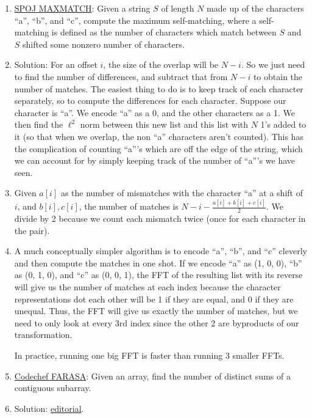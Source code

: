 \documentclass{beamer}                             %
\begin{document}
\begin{frame}
\begin{enumerate}
  \item \href{https://www.spoj.com/problems/MAXMATCH/}{SPOJ MAXMATCH}:
    Given a string \( S \) of length \( N \) made up of the characters
    \enquote{a}, \enquote{b}, and \enquote{c}, compute the maximum
    self-matching, where a self-matching is defined as the number of characters
    which match between \( S \) and \( S \) shifted some
    nonzero number of characters.
   \addtocounter{enumi}{-1}
 \item Solution: For an offset \( i \), the size of the overlap
    will be \( N - i \). So we just need to find the number of differences,
    and subtract that from \( N - i \) to obtain the number of matches.
    The easiest thing to do is to keep track of each character separately,
    so to compute the differences for each character.
    Suppose our character is \enquote{a}. We encode \enquote{a} as a 0,
    and the other characters as a 1. We then find the \( \ell^2 \) norm between 
    this new list and this list with \( N \) 1's added to it
    (so that when we overlap, the non \enquote{a} characters aren't counted).
    This has the complication of counting \enquote{a}'s which are off the edge
    of the string, which we can account for by simply keeping track of the 
    number of \enquote{a}'s we have seen.
    \addtocounter{enumi}{-1}
  \item Given \( a[i] \) as the number of mismatches with the character \enquote{a}
    at a shift of \( i \), and \( b[i], c[i] \), the number of matches is 
    \( N - i - \frac{a[i] + b[i] + c[i]}{2} \). We divide by 2 because we
    count each mismatch twice (once for each character in the pair).
    \addtocounter{enumi}{-1}
  \item A much conceptually simpler algorithm is to encode \enquote{a}, \enquote{b},
    and \enquote{c} cleverly and then compute the matches in one shot. 
    If we encode \enquote{a} as (1, 0, 0), \enquote{b} as (0, 1, 0), and
    \enquote{c} as (0, 0, 1), the FFT of the resulting list with its reverse
    will give us the number of matches at each index because the character
    representations dot each other will be 1 if they are equal, and 0 
    if they are unequal. Thus, the FFT will give us exactly the number of
    matches, but we need to only look at every 3rd index since the other 2
    are byproducts of our transformation.

    In practice, running one big FFT is faster than running 3 smaller FFTs.

  \item \href{https://www.codechef.com/problems/FARASA}{Codechef FARASA}:
    Given an array, find the number of distinct sums of a contiguous subarray.
    \addtocounter{enumi}{-1}
  \item Solution: \href{https://discuss.codechef.com/t/farasa-editorial/2688}
    {editorial}.


\end{enumerate}
\end{frame}
\end{document}
